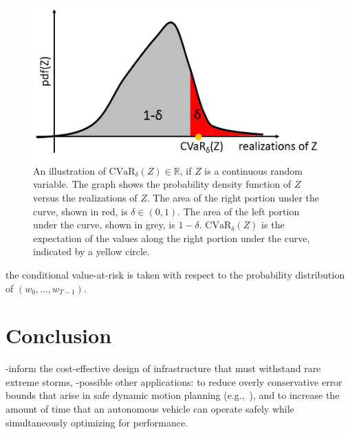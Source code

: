 \documentclass[letterpaper, 10 pt, conference]{ieeeconf}  %
\begin{document}
\begin{figure}[thpb]
      \centering
      \includegraphics[scale=0.5]{cvar.jpg}
      \caption{An illustration of $\text{CVaR}_\delta(Z) \in \mathbb{R}$, if $Z$ is a continuous random variable. 
	  The graph shows the probability density function of $Z$ versus the realizations of $Z$.
	  The area of the right portion under the curve, shown in red, is $\delta \in (0,1)$.	  
	  The area of the left portion under the curve, shown in grey, is $1-\delta$.
	  $\text{CVaR}_\delta(Z)$ is the expectation of the values along the right portion under the curve, indicated by a yellow circle.}
      \label{cvar}
\end{figure}

the conditional value-at-risk is taken with respect to the probability distribution of $(w_0, \dots, w_{T-1})$. 

\section{Conclusion}\label{conclusion}
-inform the cost-effective design of infrastructure that must withstand rare extreme storms,
-possible other applications: to reduce overly conservative error bounds that arise in safe dynamic motion planning (e.g.,~\cite{herbert2017fastrack}), 
and to increase the amount of time that an autonomous vehicle can operate safely while simultaneously optimizing for performance.

\end{document}
